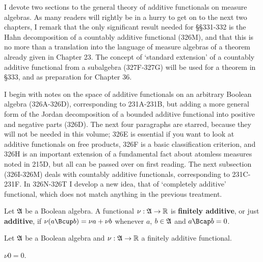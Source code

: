 
\def\chaptername{Measure algebras}
\def\sectionname{Additive functionals on Boolean algebras}


I devote two sections to the general theory of additive functionals on
measure algebras.   As many readers will rightly be in a hurry to get on
to the next two chapters, I remark that the only significant result
needed for \S\S331-332 is the Hahn decomposition of a countably
additive functional (326M), and that this is no more than a translation
into the language of measure algebras of a theorem already given in
Chapter 23.   The concept of `standard extension' of a
countably additive functional from a subalgebra (327F-327G) will be used
for a theorem in \S333, and as preparation for Chapter 36.

I begin with notes on the space of additive functionals on an arbitrary
Boolean algebra (326A-326D), corresponding to 231A-231B, but adding a
more general form of the Jordan decomposition of a bounded additive
functional into positive and negative parts (326D).
The next four paragraphs are starred, because they will not be needed in
this volume;  326E is essential if you want to look at additive functionals
on free products, 326F is a basic classification criterion, and 326H is an
important extension of a fundamental fact about atomless measures noted in
215D, but all can be passed over on first reading.
The next
subsection (326I-326M) deals with countably additive functionals,
corresponding to 231C-231F.   In 326N-326T I develop a new idea, that of
`completely additive' functional, which does not match anything in
the previous treatment.

  Let $\frak A$ be a
Boolean algebra.   A functional $\nu:\frak A\to\Bbb R$ is {\bf
finitely additive}, or just {\bf additive}, if
$\nu(a\Bcup b)=\nu a+\nu b$ whenever $a$, $b\in\frak A$ and
$a\Bcap b=0$.


 Let $\frak A$ be a Boolean algebra and
$\nu:\frak A\to\Bbb R$ a finitely additive functional.   

 $\nu 0=0$.

